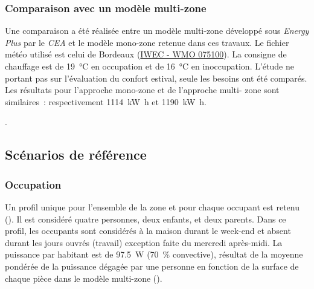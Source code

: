 \subsubsection{Comparaison avec un modèle multi-zone} %
\label{ssub:comparaison_avec_un_modele_multi_zone}
Une comparaison a été réalisée entre un modèle multi-zone développé sous \textit{Energy Plus}
par le \textit{CEA} et le modèle mono-zone retenue dans ces travaux. Le fichier météo
utilisé est celui de Bordeaux
(\href{https://www.energyplus.net/weather-download/europe_wmo_region_6/FRA//FRA_Bordeaux.075100_IWEC/all}{IWEC - WMO 075100}).
La consigne de chauffage est de \SI{19}{\celsius} en occupation et de \SI{16}{\celsius} en
inoccupation. L’étude ne portant pas sur l’évaluation du confort estival, seule les
besoins ont été comparés. Les résultats pour l’approche mono-zone et de l’approche multi-
zone sont similaires~: respectivement \SI{1114}{\kilo\watt\hour} et
\SI{1190}{\kilo\watt\hour}.

.


\subsection{Scénarios de référence} %
\label{sub:scenarios_de_reference}
\subsubsection{Occupation} %
\label{ssub:profil_d_occupation}
Un profil unique pour l’ensemble de la zone et pour chaque occupant est retenu
(). Il est considéré quatre personnes, deux enfants, et deux parents. Dans ce profil,
les occupants sont considérés à la maison durant le week-end et absent durant les jours
ouvrés (travail) exception faite du mercredi après-midi.
La puissance par habitant est de \SI{97.5}{\watt} (\SI{70}{\percent} convective), résultat
de la moyenne pondérée de la puissance dégagée par une personne en fonction de la surface
de chaque pièce dans le modèle multi-zone ().

